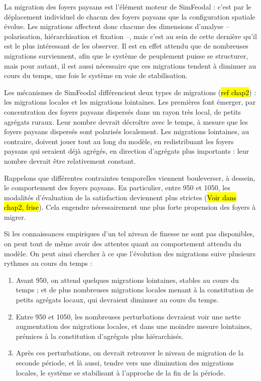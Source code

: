 La migration des foyers paysans est l'élément moteur de SimFeodal :
c'est par le déplacement individuel de chacun des foyers paysans que la configuration spatiale évolue.
Les migrations affectent donc chacune des dimensions d'analyse -- polarisation, hiérarchisation et fixation --, mais c'est au sein de cette dernière qu'il est le plus intéressant de les observer.
Il est en effet attendu que de nombreuses migrations surviennent, afin que le système de peuplement puisse se structurer, mais pour autant, il est aussi nécessaire que ces migrations tendent à diminuer au cours du temps, une fois le système en voie de stabilisation.

Les mécanismes de SimFeodal différencient deux types de migrations (\hl{ref chap2}) : les migrations locales et les migrations lointaines.
Les premières font émerger, par concentration des foyers paysans dispersés dans un rayon très local, de petits agrégats ruraux.
Leur nombre devrait décroître avec le temps, à mesure que les foyers paysans dispersés sont polarisés localement.
Les migrations lointaines, au contraire, doivent jouer tout au long du modèle, en redistribuant les foyers paysans qui seraient déjà agrégés, en direction d'agrégats plus importants : leur nombre devrait être relativement constant.

Rappelons que différentes contraintes temporelles viennent bouleverser, à dessein, le comportement des foyers paysans.
En particulier, entre 950 et 1050, les modalités d'évaluation de la satisfaction deviennent plus strictes (\hl{Voir dans chap2, frise}).
Cela engendre nécessairement une plus forte propension des foyers à migrer.

Si les connaissances empiriques d'un tel niveau de finesse ne sont pas disponibles, on peut tout de même avoir des attentes quant au comportement attendu du modèle.
On peut ainsi chercher à ce que l'évolution des migrations suive plusieurs rythmes au cours du temps :
\begin{enumerate}
\item Avant 950, on attend quelques migrations lointaines, stables au cours du temps ; et de plus nombreuses migrations locales menant à la constitution de petits agrégats locaux, qui devraient diminuer au cours du temps.
\item Entre 950 et 1050, les nombreuses perturbations devraient voir une nette augmentation des migrations locales, et dans une moindre mesure lointaines, prémices à la constitution d'agrégats plus hiérarchisés.
\item Après ces perturbations, on devrait retrouver le niveau de migration de la seconde période, et là aussi, tendre vers une diminution des migrations locales, le système se stabilisant à l'approche de la fin de la période.
\end{enumerate}

